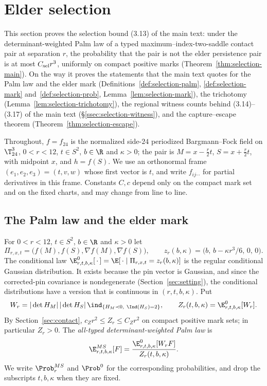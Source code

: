 \section{Elder selection}\label{sec:selection}

This section proves the selection bound (3.13) of the main text: under the determinant-weighted Palm law of a typed maximum--index-two-saddle contact pair at separation $r$, the probability that the pair is not the elder persistence pair is at most $C_{\rm sel}r^3$, uniformly on compact positive marks (Theorem~\ref{thm:selection-main}). On the way it proves the statements that the main text quotes for the Palm law and the elder mark (Definitions~\ref{def:selection-palm}, \ref{def:selection-mark} and~\ref{def:selection-prob}, Lemma~\ref{lem:selection-mark}), the trichotomy (Lemma~\ref{lem:selection-trichotomy}), the regional witness counts behind (3.14)--(3.17) of the main text (\S\ref{ssec:selection-witness}), and the capture--escape theorem (Theorem~\ref{thm:selection-escape}).

Throughout, $f=f_{24}$ is the normalized side-$24$ periodized Bargmann--Fock field on $\T^3_{24}$, $0<r<12$, $t\in S^2$, $b\in\R$ and $\kappa>0$; the pair is $M=x-\frac r2t$, $S=x+\frac r2t$, with midpoint $x$, and $h=f(S)$. We use an orthonormal frame $(e_1,e_2,e_3)=(t,v,w)$ whose first vector is $t$, and write $f_{ij\cdots}$ for partial derivatives in this frame. Constants $C,c$ depend only on the compact mark set and on the fixed charts, and may change from line to line.

\subsection{The Palm law and the elder mark}\label{ssec:selection-palm}

\begin{definition}\label{def:selection-palm}
For $0<r<12$, $t\in S^2$, $b\in\R$ and $\kappa>0$ let
\[
\Pi_{r,x,t}=\bigl(f(M),f(S),\nabla f(M),\nabla f(S)\bigr),\qquad z_r(b,\kappa)=\bigl(b,\,b-\kappa r^3/6,\,0,\,0\bigr).
\]
The conditional law $\E^0_{r,t,b,\kappa}[\,\cdot\,]=\E[\,\cdot\mid\Pi_{r,x,t}=z_r(b,\kappa)]$ is the regular conditional Gaussian distribution. It exists because the pin vector is Gaussian, and since the corrected-pin covariance is nondegenerate (Section~\ref{sec:setting}), the conditional distributions have a version that is continuous in $(r,t,b,\kappa)$. Put
\[
W_r=|\det H_M|\,|\det H_S|\,\ind_{\{H_M\prec0,\ \Ind(H_S)=2\}},\qquad Z_r(t,b,\kappa)=\E^0_{r,t,b,\kappa}[W_r].
\]
By Section~\ref{sec:contact}, $c_Zr^2\le Z_r\le C_Zr^2$ on compact positive mark sets; in particular $Z_r>0$. The \emph{all-typed determinant-weighted Palm law} is
\begin{equation}\label{eq:selection-palm}
\E^{MS}_{r,t,b,\kappa}[F]=\frac{\E^0_{r,t,b,\kappa}[W_rF]}{Z_r(t,b,\kappa)} .
\end{equation}
We write $\Prob^{MS}_r$ and $\Prob^0$ for the corresponding probabilities, and drop the subscripts $t,b,\kappa$ when they are fixed.
\end{definition}

